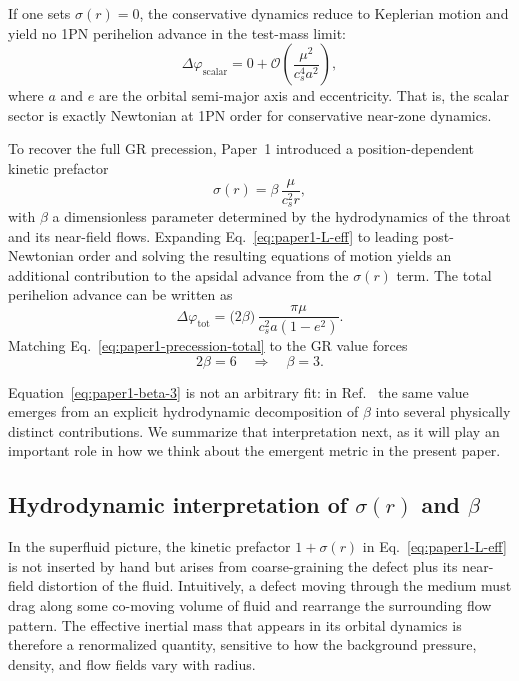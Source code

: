 \documentclass[11pt]{article}
\newcommand{\cS}{c_s}
\begin{document}
If one sets $\sigma(r)=0$, the conservative dynamics reduce to Keplerian motion
and yield no 1PN perihelion advance in the test-mass limit:
\begin{equation}
  \Delta\varphi_{\text{scalar}}
  = 0
  + \mathcal{O}\!\left(\frac{\mu^2}{\cS^4 a^2}\right),
  \label{eq:paper1-precession-scalar}
\end{equation}
where $a$ and $e$ are the orbital semi-major axis and eccentricity.
That is, the scalar sector is exactly Newtonian at 1PN order for conservative
near-zone dynamics.

To recover the full GR precession, Paper~1 introduced a position-dependent
kinetic prefactor
\begin{equation}
  \sigma(r)
  = \beta\,\frac{\mu}{\cS^2 r},
  \label{eq:paper1-sigma}
\end{equation}
with $\beta$ a dimensionless parameter determined by the hydrodynamics of
the throat and its near-field flows.
Expanding Eq.~\eqref{eq:paper1-L-eff} to leading post-Newtonian order and
solving the resulting equations of motion yields an additional contribution
to the apsidal advance from the $\sigma(r)$ term.  The total perihelion
advance can be written as
\begin{equation}
  \Delta\varphi_{\text{tot}}
  = \bigl(2\beta\bigr)\,
    \frac{\pi \mu}{\cS^2 a(1-e^2)}.
  \label{eq:paper1-precession-total}
\end{equation}
Matching Eq.~\eqref{eq:paper1-precession-total} to the GR value forces
\begin{equation}
  2\beta = 6
  \quad\Rightarrow\quad
  \beta = 3.
  \label{eq:paper1-beta-3}
\end{equation}

Equation~\eqref{eq:paper1-beta-3} is not an arbitrary fit: in
Ref.~\cite{Norris:2025Orbits} the same value emerges from an explicit
hydrodynamic decomposition of $\beta$ into several physically distinct
contributions.
We summarize that interpretation next, as it will play an important role in
how we think about the emergent metric in the present paper.

\subsection{Hydrodynamic interpretation of \texorpdfstring{$\sigma(r)$}{sigma(r)} and \texorpdfstring{$\beta$}{beta}}
\label{subsec:paper1-beta}

In the superfluid picture, the kinetic prefactor $1+\sigma(r)$ in
Eq.~\eqref{eq:paper1-L-eff} is not inserted by hand but arises from
coarse-graining the defect plus its near-field distortion of the fluid.
Intuitively, a defect moving through the medium must drag along some
co-moving volume of fluid and rearrange the surrounding flow pattern.  The
effective inertial mass that appears in its orbital dynamics is therefore a
renormalized quantity, sensitive to how the background pressure, density,
and flow fields vary with radius.
\end{document}
